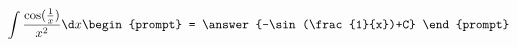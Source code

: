 \documentclass{ximera}
\author{Steven Gubkin}
\begin{document}
\begin{exercise}


\[
\int \frac{\cos(\frac{1}{x})}{x^2} \d x \begin{prompt} = \answer{-\sin(\frac{1}{x})+C} \end{prompt}
\]

\end{exercise}
\end{document}
